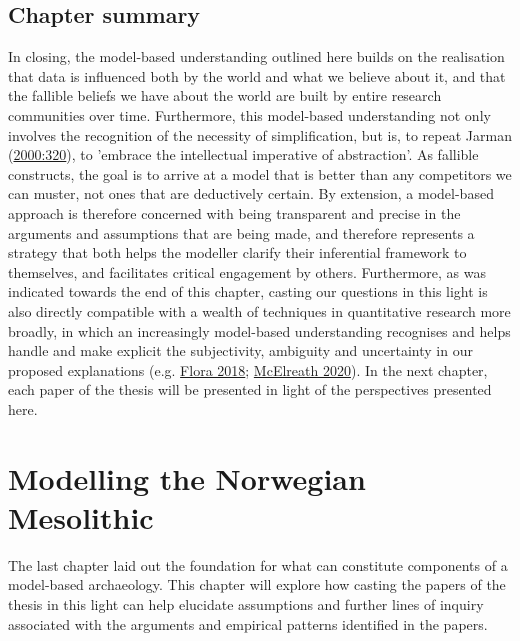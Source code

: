 \documentclass[
  12pt,
  a4paper,
  oneside]{book}
\begin{document}
\hypertarget{chapter-summary-2}{%
\section{Chapter summary}\label{chapter-summary-2}}

In closing, the model-based understanding outlined here builds on the realisation that data is influenced both by the world and what we believe about it, and that the fallible beliefs we have about the world are built by entire research communities over time. Furthermore, this model-based understanding not only involves the recognition of the necessity of simplification, but is, to repeat Jarman (\protect\hyperlink{ref-jarman2000}{2000:320}), to 'embrace the intellectual imperative of abstraction'. As fallible constructs, the goal is to arrive at a model that is better than any competitors we can muster, not ones that are deductively certain. By extension, a model-based approach is therefore concerned with being transparent and precise in the arguments and assumptions that are being made, and therefore represents a strategy that both helps the modeller clarify their inferential framework to themselves, and facilitates critical engagement by others. Furthermore, as was indicated towards the end of this chapter, casting our questions in this light is also directly compatible with a wealth of techniques in quantitative research more broadly, in which an increasingly model-based understanding recognises and helps handle and make explicit the subjectivity, ambiguity and uncertainty in our proposed explanations (e.g. \protect\hyperlink{ref-flora2018}{Flora 2018}; \protect\hyperlink{ref-mcelreath2020}{McElreath 2020}). In the next chapter, each paper of the thesis will be presented in light of the perspectives presented here.

\hypertarget{modelling-the-norwegian-mesolithic}{%
\chapter{Modelling the Norwegian Mesolithic}\label{modelling-the-norwegian-mesolithic}}

The last chapter laid out the foundation for what can constitute components of a model-based archaeology. This chapter will explore how casting the papers of the thesis in this light can help elucidate assumptions and further lines of inquiry associated with the arguments and empirical patterns identified in the papers.
\end{document}
